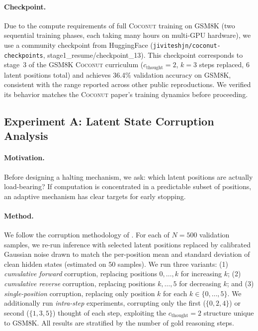 \documentclass{article}
\begin{document}
\paragraph{Checkpoint.} Due to the compute requirements of full \textsc{Coconut} training on GSM8K \citep{cobbe2021gsm8k, icot2024} (two sequential training phases, each taking many hours on multi-GPU hardware), we use a community checkpoint from HuggingFace (\texttt{jiviteshjn/coconut-checkpoints}, stage1\_resume/checkpoint\_13). This checkpoint corresponds to stage~3 of the GSM8K \textsc{Coconut} curriculum ($c_{\mathrm{thought}} = 2$, $k = 3$ steps replaced, 6 latent positions total) and achieves 36.4\% validation accuracy on GSM8K, consistent with the range reported across other public reproductions. We verified its behavior matches the \textsc{Coconut} paper's training dynamics before proceeding.

\subsection{Experiment A: Latent State Corruption Analysis}
\label{sec:corruption}

\paragraph{Motivation.} Before designing a halting mechanism, we ask: which latent positions are actually load-bearing? If computation is concentrated in a predictable subset of positions, an adaptive mechanism has clear targets for early stopping.

\paragraph{Method.} We follow the corruption methodology of \citet{martin2025curriculum}. For each of $N = 500$ validation samples, we re-run inference with selected latent positions replaced by calibrated Gaussian noise drawn to match the per-position mean and standard deviation of clean hidden states (estimated on 50 samples). We run three variants: (1) \textit{cumulative forward} corruption, replacing positions $0, \ldots, k$ for increasing $k$; (2) \textit{cumulative reverse} corruption, replacing positions $k, \ldots, 5$ for decreasing $k$; and (3) \textit{single-position} corruption, replacing only position $k$ for each $k \in \{0,\ldots,5\}$. We additionally run \textit{intra-step} experiments, corrupting only the first ($\{0, 2, 4\}$) or second ($\{1, 3, 5\}$) thought of each step, exploiting the $c_{\mathrm{thought}} = 2$ structure unique to GSM8K. All results are stratified by the number of gold reasoning steps.
\end{document}
